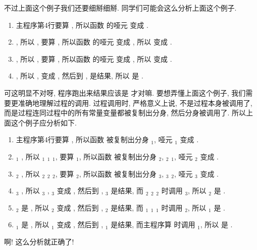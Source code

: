 不过上面这个例子我们还要细掰细掰. 同学们可能会这么分析上面这个例子.
\begin{enumerate}
    \item 主程序第4行要算 , 所以函数  的哑元  变成 .
    \item {}, 所以 , 要算 , 所以函数  的哑元  变成 , 所以  变成 .
    \item {}, 所以 , 要算 , 所以函数  的哑元  变成 , 所以  变成 .
    \item {}, 所以 ,  变成 , 然后到 ,  是结果, 所以  是 .
\end{enumerate}
可这明显不对呀, 程序跑出来结果应该是  才对嘛. 要想弄懂上面这个例子, 我们需要更准确地理解过程的调用. 过程调用时, 严格意义上说, 不是过程本身被调用了, 而是过程连同过程中的所有常量变量都被复制出分身, 然后分身被调用了. 所以上面这个例子应分析如下.
\begin{enumerate}
    \item 主程序第4行要算 , 所以函数  被复制出分身 $_1$, 哑元 $_1$ 变成 .
    \item {}$_1$ , 所以 $_1$ $_1$ $_1$, 要算 $_1$, 所以函数  被复制出分身 $_2$, $_2$ $_1$, 哑元 $_2$ 变成 .
    \item {}$_2$ , 所以 $_2$ $_2$ $_2$, 要算 $_2$, 所以函数  被复制出分身 $_3$, $_3$ $_2$, 哑元 $_3$ 变成 .
    \item {}$_3$ , 所以 $_3$ , $_3$ 变成 , 然后到 , $_3$ 是结果, 而 $_2$ $_2$ $_2$ 时调用 $_3$, 所以 $_2$ 是 .
    \item {}$_2$ 是 , 所以 $_2$ 变成 , 然后到 , $_2$ 是结果, 而 $_1$ $_1$ $_1$ 时调用 $_2$, 所以 $_1$ 是 .
    \item {}$_1$ 是 , 所以 $_1$ 变成 , 然后到 , $_1$ 是结果, 而主程序算  时调用 $_1$, 所以  是 .
\end{enumerate}
啊! 这么分析就正确了!

